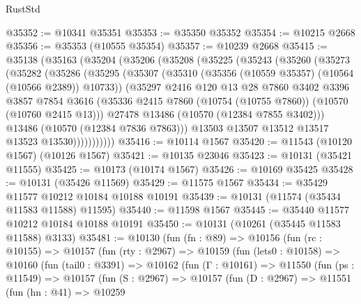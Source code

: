 \begin{lexlean}{RustStd}
\begin{coremodule}
@35352 := @10341 @35351
@35353 := @35350 @35352
@35354 := @10215 @2668
@35356 := @35353 (@10555 @35354)
@35357 := @10239 @2668
@35415 := @35138
    (@35163
      (@35204
        (@35206
          (@35208
            (@35225
              (@35243
                (@35260
                  (@35273
                    (@35282
                      (@35286
                        (@35295
                          (@35307
                            (@35310 (@35356 (@10559 @35357) (@10564 (@10566 @2389)) @10733))
                            (@35297
                              @2416
                              @120
                              @13
                              @28
                              @7860
                              @3402
                              @3396
                              @3857
                              @7854
                              @3616
                              (@35336
                                @2415
                                @7860
                                (@10754 (@10755 @7860))
                                (@10570 (@10760 @2415 @13)))
                              @27478
                              @13486
                              (@10570 (@12384 @7855 @3402)))
                            @13486
                            (@10570 (@12384 @7836 @7863)))
                          @13503
                          @13507
                          @13512
                          @13517
                          @13523
                          @13530)))))))))))
@35416 := @10114 @1567
@35420 := @11543 (@10120 @1567) (@10126 @1567)
@35421 := @10135 @23046
@35423 := @10131 (@35421 @11555)
@35425 := @10173 (@10174 @1567)
@35426 := @10169 @35425
@35428 := @10131 (@35426 @11569)
@35429 := @11575 @1567
@35434 := @35429 @11577 @10212 @10184 @10188 @10191
@35439 := @10131 (@11574 (@35434 @11583 @11588) @11595)
@35440 := @11598 @1567
@35445 := @35440 @11577 @10212 @10184 @10188 @10191
@35450 := @10131 (@10261 (@35445 @11583 @11588) @3133)
@35481 := @10130
    (fun (fn : @89) =>
    @10156
      (fun (rc : @10155) =>
      @10157
        (fun (rty : @2967) =>
        @10159
          (fun (lets0 : @10158) =>
          @10160
            (fun (tail0 : @3391) =>
            @10162
              (fun (Γ : @10161) =>
              @11550
                (fun (ps : @11549) =>
                @10157
                  (fun (S : @2967) =>
                  @10157
                    (fun (D : @2967) =>
                    @11551
                      (fun (hn : @41) =>
                      @10259

\end{coremodule}
\end{lexlean}
